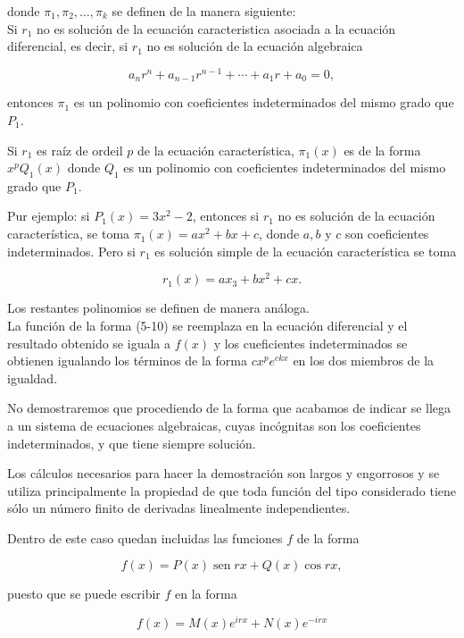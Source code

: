 \documentclass[10pt]{article}
\theoremstyle{plain}
\theoremstyle{definition}
\theoremstyle{remark}
\begin{document}
donde $\pi_{1}, \pi_{2}, \ldots, \pi_{k}$ se definen de la manera siguiente:\\
Si $r_{1}$ no es solución de la ecuación caracteristica asociada a la ecuación diferencial, es decir, si $r_{1}$ no es solución de la ecuación algebraica

$$
a_{n} r^{n}+a_{n-1} r^{n-1}+\cdots+a_{1} r+a_{0}=0,
$$

entonces $\pi_{1}$ es un polinomio con coeficientes indeterminados del mismo grado que $P_{1}$.

Si $r_{1}$ es raíz de ordeil $p$ de la ecuación característica, $\pi_{1}(x)$ es de la forma $x^{p} Q_{1}(x)$ donde $Q_{1}$ es un polinomio con coeficientes indeterminados del mismo grado que $P_{1}$.

Pur ejemplo: si $P_{1}(x)=3 x^{2}-2$, entonces si $r_{1}$ no es solución de la ecuación característica, se toma $\pi_{1}(x)=a x^{2}+b x+c$, donde $a, b$ y $c$ son coeficientes indeterminados. Pero si $r_{1}$ es solución simple de la ecuación característica se toma


$$
r_{1}(x)=a x_{3}+b x^{2}+c x .
$$

Los restantes polinomios se definen de manera análoga.\\
La función de la forma (5-10) se reemplaza en la ecuación diferencial y el resultado obtenido se iguala a $f(x)$ y los cueficientes indeterminados se obtienen igualando los términos de la forma $c x^{p} e^{c k x}$ en los dos miembros de la igualdad.

No demostraremos que procediendo de la forma que acabamos de indicar se llega a un sistema de ecuaciones algebraicas, cuyas incógnitas son los coeficientes indeterminados, y que tiene siempre solución.

Los cálculos necesarios para hacer la demostración son largos y engorrosos y se utiliza principalmente la propiedad de que toda función del tipo considerado tiene sólo un número finito de derivadas linealmente independientes.

Dentro de este caso quedan incluidas las funciones $f$ de la forma


\begin{equation*}
f(x)=P(x) \operatorname{sen} r x+Q(x) \cos r x, \tag{5-11}
\end{equation*}


puesto que se puede escribir $f$ en la forma


\begin{equation*}
f(x)=M(x) e^{i r x}+N(x) e^{-i r x} \tag{5-12}
\end{equation*}
\end{document}
